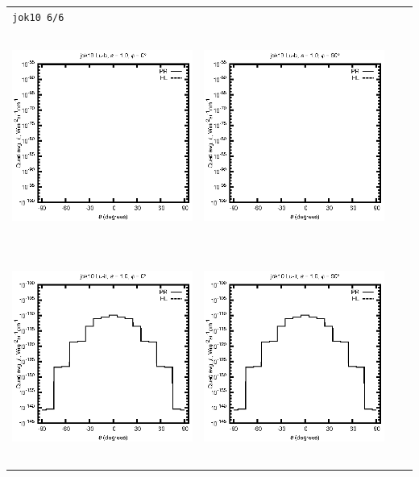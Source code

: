 \documentclass[10pt,a4paper]{article}
\begin{document}
\begin{adjustwidth}{-1.2in}{-1.2in}
\begin{tabular}{c c c c}
\multicolumn{4}{l}{\texttt{jok10 6/6}} \\
\includegraphics[height=7cm]{../eps/jok10_Lu_b_fwd.eps} &
\includegraphics[height=7cm]{../eps/jok10_Lu_b_cross.eps} \\
\includegraphics[height=7cm]{../eps/jok10_Lu_it_fwd.eps} &
\includegraphics[height=7cm]{../eps/jok10_Lu_it_cross.eps} \\

\end{tabular}
\end{adjustwidth}
\end{document}
